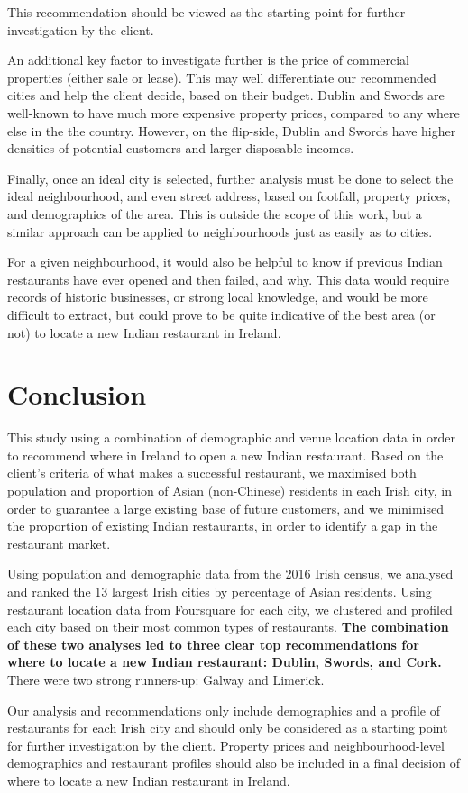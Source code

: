 \documentclass[a4paper,11pt]{article}
\begin{document}
This recommendation should be viewed as the starting point for further investigation by the client.

An additional key factor to investigate further is the price of commercial properties (either sale or lease). This may well differentiate our recommended cities and help the client decide, based on their budget. Dublin and Swords are well-known to have much more expensive property prices, compared to any where else in the the country. However, on the flip-side, Dublin and Swords have higher densities of potential customers and larger disposable incomes.

Finally, once an ideal city is selected, further analysis must be done to select the ideal neighbourhood, and even street address, based on footfall, property prices, and demographics of the area. This is outside the scope of this work, but a similar approach can be applied to neighbourhoods just as easily as to cities.

For a given neighbourhood, it would also be helpful to know if previous Indian restaurants have ever opened and then failed, and why. This data would require records of historic businesses, or strong local knowledge, and would be more difficult to extract, but could prove to be quite indicative of the best area (or not) to locate a new Indian restaurant in Ireland.

\section{Conclusion}

This study using a combination of demographic and venue location data in order to recommend where in Ireland to open a new Indian restaurant. Based on the client's criteria of what makes a successful restaurant, we maximised both population and proportion of Asian (non-Chinese) residents in each Irish city, in order to guarantee a large existing base of future customers, and we minimised the proportion of existing Indian restaurants, in order to identify a gap in the restaurant market.

Using population and demographic data from the 2016 Irish census, we analysed and ranked the 13 largest Irish cities by percentage of Asian residents. Using restaurant location data from Foursquare for each city, we clustered and profiled each city based on their most common types of restaurants. \textbf{The combination of these two analyses led to three clear top recommendations for where to locate a new Indian restaurant: Dublin, Swords, and Cork.} There were two strong runners-up: Galway and Limerick.

Our analysis and recommendations only include demographics and a profile of restaurants for each Irish city and should only be considered as a starting point for further investigation by the client. Property prices and neighbourhood-level demographics and restaurant profiles should also be included in a final decision of where to locate a new Indian restaurant in Ireland.
\end{document}
